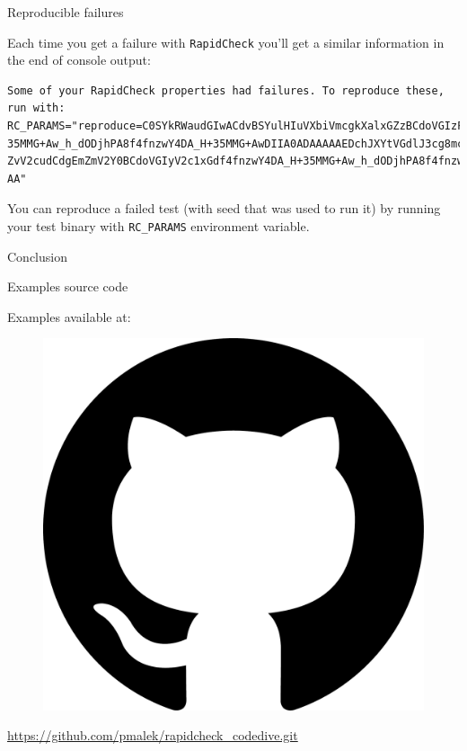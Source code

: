 \documentclass{beamer}
\begin{document}
\begin{frame}[fragile]{Reproducible failures}

Each time you get a failure with \texttt{RapidCheck} you'll get
a similar information in the end of console output:

\begin{lstlisting}[style=shell]
Some of your RapidCheck properties had failures. To reproduce these, run with:
RC_PARAMS="reproduce=C0SYkRWaudGIwACdvBSYulHIuVXbiVmcgkXalxGZzBCdoVGIzFWblBib11mYlJ3H+
35MMG+Aw_h_dODjhPA8f4fnzwY4DA_H+35MMG+AwDIIA0ADAAAAAEDchJXYtVGdlJ3cg8mckVmcgMGah52ZlBC
ZvV2cudCdgEmZmV2Y0BCdoVGIyV2c1xGdf4fnzwY4DA_H+35MMG+Aw_h_dODjhPA8f4fnzwY4DAPggAQDMAAAA
AA"
\end{lstlisting}

You can reproduce a failed test (with seed that was used to run
it) by running your test binary with \texttt{RC\_PARAMS}
environment variable.

\end{frame}





\begin{frame}{Conclusion}

\begin{center}




\end{center}

\end{frame}


\begin{frame}[fragile]{Examples source code}
\begin{center}
  Examples available at:

  \begin{figure}
  \includegraphics[page=1,width=.05\textwidth]{octo}
  \end{figure}

  \url{https://github.com/pmalek/rapidcheck_codedive.git}
\end{center}

\end{frame}
\end{document}

